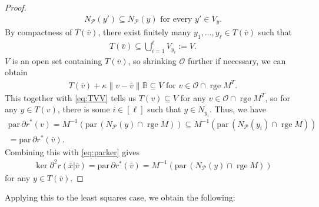 \documentclass[reqno]{amsart}
\numberwithin{equation}{section}
\newcommand{\pol}{\mathcal{P}}
\newcommand{\para}{\mathrm{par}\,}
\newcommand{\rge}{\operatorname{rge}}
\begin{document}
\begin{proof}
    \begin{align*}
        N_{\pol}(y') \subseteq N_{\pol}(y) \text{ for every } y' \in V_y.
     \end{align*} By compactness of $T(\bar{v})$, there exist finitely many $y_1,...,y_{\ell} \in T(\bar{v})$ such that \begin{align*}
        T(\bar{v}) \subseteq \bigcup\limits_{i=1}^{\ell} V_{y_{i}} := V.
     \end{align*} 
     $V$ is an open set containing $T(\bar{v})$, so shrinking $\mathcal{O}$ further if necessary, we can obtain
     \begin{align*}
        T(\bar{v}) + \kappa \lVert v - \bar{v} \rVert \mathbb{B} \subseteq V \text{ for } v \in \mathcal{O} \cap \rge M^T.
     \end{align*} This together with \eqref{eq:TVV} tells us $T(v) \subseteq V$ for any $v \in \mathcal{O} \cap \rge M^T$,
     so for any $y \in T(v)$, there is some $i \in [\ell]$ such that $y \in N_{y_{i}}$.
     Thus, we have 
     \begin{align*}
        \para \partial r^*(v) = M^{-1} (\para(N_{\pol}(y) \cap \rge M)) \subseteq
        M^{-1} (\para(N_{\pol}(y_i) \cap \rge M))\\ = \para \partial r^* (\bar{v}).
     \end{align*}
     Combining this with \eqref{eq:parker} gives 
     \begin{align}\label{eq:kerr}
        \ker \partial^2 r(\bar{x} | \bar{v}) = \para \partial r^* (\bar{v}) = M^{-1}(\para(N_{\pol}(y) \cap \rge M))
     \end{align} for any $y \in T(\bar{v})$.
\end{proof}

Applying this to the least squares case, we obtain the following:
\end{document}
